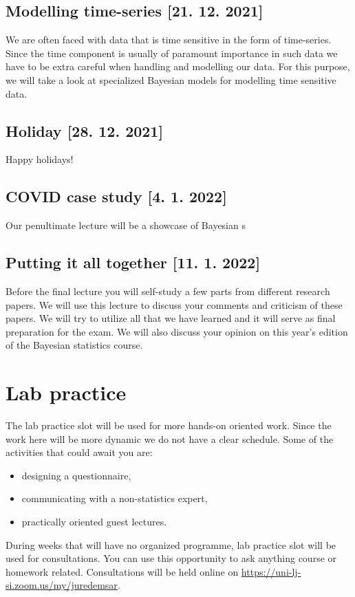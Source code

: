 \documentclass[fleqn,moreauthors,10pt]{ds_report}
\begin{document}
\subsection*{Modelling time-series [21. 12. 2021]}

We are often faced with data that is time sensitive in the form of time-series. Since the time component is usually of paramount importance in such data we have to be extra careful when handling and modelling our data. For this purpose, we will take a look at specialized Bayesian models for modelling time sensitive data.

\subsection*{Holiday [28. 12. 2021]}

Happy holidays!

\subsection*{COVID case study [4. 1. 2022]}

Our penultimate lecture will be a showcase of Bayesian s

\subsection*{Putting it all together [11. 1. 2022]}

Before the final lecture you will self-study a few parts from different research papers. We will use this lecture to discuss your comments and criticism of these papers. We will try to utilize all that we have learned and it will serve as final preparation for the exam. We will also discuss your opinion on this year's edition of the Bayesian statistics course.

\section*{Lab practice}

The lab practice slot will be used for more hands-on oriented work. Since the work here will be more dynamic we do not have a clear schedule. Some of the activities that could await you are:

\begin{itemize}
	\item designing a questionnaire,
	\item communicating with a non-statistics expert,
	\item practically oriented guest lectures.
\end{itemize}

During weeks that will have no organized programme, lab practice slot will be used for consultations. You can use this opportunity to ask anything course or homework related. Consultations will be held online on \url{https://uni-lj-si.zoom.us/my/juredemsar}.
\end{document}
